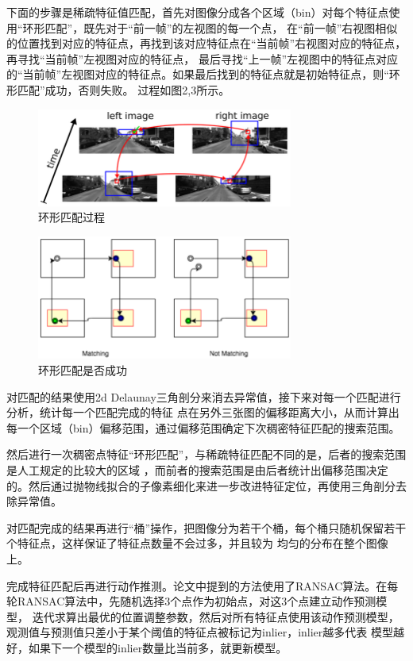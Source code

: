 \documentclass[UTF8]{ctexart}
\begin{document}
    下面的步骤是稀疏特征值匹配，首先对图像分成各个区域（bin）对每个特征点使用“环形匹配”，既先对于“前一帧”的左视图的每一个点，
    在“前一帧”右视图相似的位置找到对应的特征点，再找到该对应特征点在“当前帧”右视图对应的特征点，再寻找“当前帧”左视图对应的特征点，
    最后寻找“上一帧”左视图中的特征点对应的“当前帧”左视图对应的特征点。如果最后找到的特征点就是初始特征点，则“环形匹配”成功，否则失败。
    过程如图2,3所示。
    \begin{figure}[H]
        \centering
        \includegraphics[width=0.75\textwidth]{img/CircleMatch.png}
        \caption{环形匹配过程}
        \label{fig.2}
    \end{figure}
    \begin{figure}[H]
        \centering
        \includegraphics[width=0.75\textwidth]{img/CircleMatchOrNot.png}
        \caption{环形匹配是否成功}
        \label{fig.3}
    \end{figure}
    对匹配的结果使用2d Delaunay三角剖分来消去异常值，接下来对每一个匹配进行分析，统计每一个匹配完成的特征
    点在另外三张图的偏移距离大小，从而计算出每一个区域（bin）偏移范围，通过偏移范围确定下次稠密特征匹配的搜索范围。

    然后进行一次稠密点特征“环形匹配”，与稀疏特征匹配不同的是，后者的搜索范围是人工规定的比较大的区域
    ，而前者的搜索范围是由后者统计出偏移范围决定的。然后通过抛物线拟合的子像素细化来进一步改进特征定位，再使用三角剖分去除异常值。

    对匹配完成的结果再进行“桶”操作，把图像分为若干个桶，每个桶只随机保留若干个特征点，这样保证了特征点数量不会过多，并且较为
    均匀的分布在整个图像上。

    完成特征匹配后再进行动作推测。论文中提到的方法使用了RANSAC算法。在每轮RANSAC算法中，先随机选择3个点作为初始点，对这3个点建立动作预测模型，
    迭代求算出最优的位置调整参数，然后对所有特征点使用该动作预测模型，观测值与预测值只差小于某个阈值的特征点被标记为inlier，inlier越多代表
    模型越好，如果下一个模型的inlier数量比当前多，就更新模型。
\end{document}
